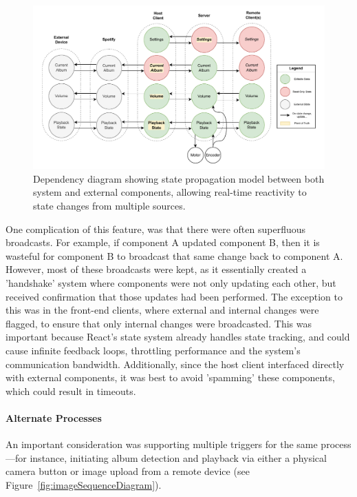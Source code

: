             \begin{figure}[h]
                \centering
                \includegraphics[width=\textwidth]{images/VTT_states.DependencyGraph.pdf}
                \caption{Dependency diagram showing state propagation model between both system and external components, allowing real-time reactivity to state changes from multiple sources.}
                \label{fig:statePropagationDiagram}
            \end{figure}
    
            One complication of this feature, was that there were often superfluous broadcasts. For example, if component A updated component B, then it is wasteful for component B to broadcast that same change back to component A. However, most of these broadcasts were kept, as it essentially created a 'handshake' system where components were not only updating each other, but received confirmation that those updates had been performed. The exception to this was in the front-end clients, where external and internal changes were flagged, to ensure that only internal changes were broadcasted. This was important because React's state system already handles state tracking, and could cause infinite feedback loops, throttling performance and the system's communication bandwidth. Additionally, since the host client interfaced directly with external components, it was best to avoid 'spamming' these components, which could result in timeouts.
    
            \paragraph{Alternate Processes}
    
            An important consideration was supporting multiple triggers for the same process—for instance, initiating album detection and playback via either a physical camera button or image upload from a remote device (see Figure~\ref{fig:imageSequenceDiagram}).
    
